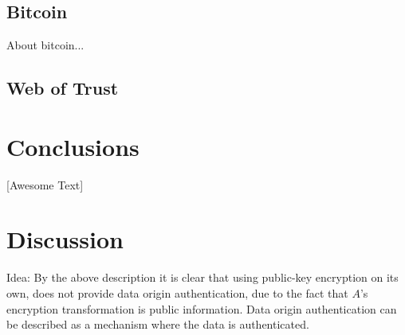 \documentclass{acm_proc_article-sp}
\begin{document}
\subsection{Bitcoin}
About bitcoin...
\subsection{Web of Trust}

\section{Conclusions}
[Awesome Text]

\section{Discussion}
Idea: By the above description it is clear that using public-key encryption on its own, does not provide data origin authentication, due to the fact that $A$'s encryption transformation is public information. Data origin authentication can be described as a  mechanism where the data is authenticated. 


%
%
\end{document}
